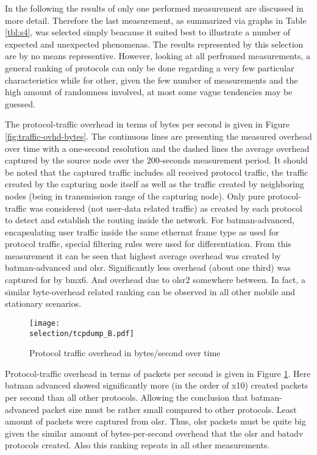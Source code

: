 \documentclass[a4paper,12pt,twoside]{article}
\begin{document}
\newcommand{\selection}{test_data/wbmv7-axn-16_2014-05-16_19-28-43/wbmv7-axn-16_2014-05-16_19-28-43_wibed-f41ab0/wbm-axn} 

In the following the results of only one performed measurement are
discussed in more detail. Therefore the last measurement, as summarized
via graphs in Table \ref{tbl:s4}, was selected simply beacause it
suited best to illustrate a number of expected and unexpected
phenomenas. The results represented by this selection are by no means
representive. However, looking at all perfromed measurements, a
general ranking of protocols can only be done regarding a very few
particular characteristics while for other, given the few number of
measurements and the high amount of randomness involved, at most some
vague tendencies may be guessed.

The protocol-traffic overhead in terms of bytes per second is given in
Figure \ref{fig:traffic-ovhd-bytes}.  The continuous lines are
presenting the measured overhead over time with a one-second
resolution and the dashed lines the average overhead captured by the
source node over the 200-seconds measurement period. It should be
noted that the captured traffic includes all received protocol
traffic, the traffic created by the capturing node itself as well as
the traffic created by neighboring nodes (being in transmission range
of the capturing node). Only pure protocol-traffic was considered (not
user-data related traffic) as created by each protocol to detect and
establish the routing inside the network. For batman-advanced,
encapsulating user traffic inside the same ethernat frame type as used
for protocol traffic, special filtering rules were used for
differentiation.
From this measurement it can be seen that highest average overhead was
created by batman-advanced and olsr. Significantly less overhead
(about one third) was captured for by bmx6. And overhead due to olsr2
somewhere between. In fact, a similar byte-overhead related ranking can
be observed in all other mobile and stationary scenarios.

\begin{figure}[!ht]
\centering
\texttt{[image: \\selection/tcpdump\_B.pdf]}
\caption{Protocol traffic overhead in bytes/second over time}
\label{fig:traffic-ovhd-packets}
\end{figure}



Protocol-traffic overhead in terms of packets per second is given in
Figure \ref{fig:traffic-ovhd-packets}. Here batman advanced showed
significantly more (in the order of x10) created packets per second
than all other protocols. Allowing the conclusion that batman-advanced
packet size must be rather small compared to other protocols. Least
amount of packets were captured from olsr. Thus, olsr packets must be
quite big given the similar amount of bytes-per-second overhead that
the olsr and batadv protocols created. Also this ranking repeats in
all other measurements.
\end{document}
